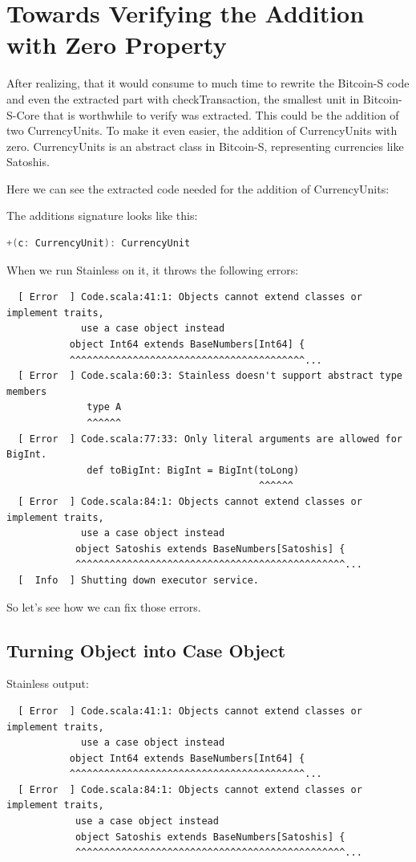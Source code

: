 \chapter{Towards Verifying the Addition with Zero Property}
\label{chap:verify_add}

After realizing, that it would consume to much time to rewrite the Bitcoin-S code and even the extracted part with checkTransaction, the smallest unit in Bitcoin-S-Core that is worthwhile to verify was extracted.
This could be the addition of two CurrencyUnits.
To make it even easier, the addition of CurrencyUnits with zero.
CurrencyUnits is an abstract class in Bitcoin-S, representing currencies like Satoshis.

Here we can see the extracted code needed for the addition of CurrencyUnits:


The additions signature looks like this:
\begin{lstlisting}[language=scala]
  +(c: CurrencyUnit): CurrencyUnit
\end{lstlisting}

When we run Stainless on it, it throws the following errors:
{\footnotesize\begin{verbatim}
  [ Error  ] Code.scala:41:1: Objects cannot extend classes or implement traits,
             use a case object instead
           object Int64 extends BaseNumbers[Int64] {
           ^^^^^^^^^^^^^^^^^^^^^^^^^^^^^^^^^^^^^^^^^...
  [ Error  ] Code.scala:60:3: Stainless doesn't support abstract type members
              type A
              ^^^^^^
  [ Error  ] Code.scala:77:33: Only literal arguments are allowed for BigInt.
              def toBigInt: BigInt = BigInt(toLong)
                                            ^^^^^^
  [ Error  ] Code.scala:84:1: Objects cannot extend classes or implement traits,
             use a case object instead
            object Satoshis extends BaseNumbers[Satoshis] {
            ^^^^^^^^^^^^^^^^^^^^^^^^^^^^^^^^^^^^^^^^^^^^^^^...
  [  Info  ] Shutting down executor service.
\end{verbatim}}

So let's see how we can fix those errors.


\section{Turning Object into Case Object}

Stainless output:
{\footnotesize\begin{verbatim}
  [ Error  ] Code.scala:41:1: Objects cannot extend classes or implement traits,
             use a case object instead
           object Int64 extends BaseNumbers[Int64] {
           ^^^^^^^^^^^^^^^^^^^^^^^^^^^^^^^^^^^^^^^^^...
  [ Error  ] Code.scala:84:1: Objects cannot extend classes or implement traits,
            use a case object instead
            object Satoshis extends BaseNumbers[Satoshis] {
            ^^^^^^^^^^^^^^^^^^^^^^^^^^^^^^^^^^^^^^^^^^^^^^^...
\end{verbatim}}

